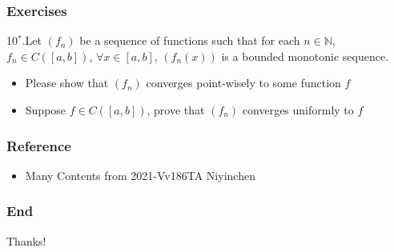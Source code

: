 \documentclass{beamer}
\begin{document}
\begin{frame}
    \frametitle{Exercises}
    10$^*$.Let $(f_n )$ be a sequence of functions such that for each $n\in \mathbb{N}$,
    $f_n  \in C([a,b])$, $\forall x \in [a,b]$,  $(f_n (x))$ is a bounded monotonic sequence.\\
    \vspace{1em}
    \begin{itemize}
        \item Please show that $(f_n)$ converges point-wisely to some function $f$
        \item Suppose $f \in C([a,b])$, prove that $(f_n )$ converges uniformly to $f $
    \end{itemize}

\end{frame}


\begin{frame}
    \frametitle{Reference}
    \begin{itemize}
        \item Many Contents from 2021-Vv186TA Niyinchen
    \end{itemize}
\end{frame}
\begin{frame}
    \frametitle{End}
    \centering
    \LARGE{Thanks!}


\end{frame}
\end{document}
